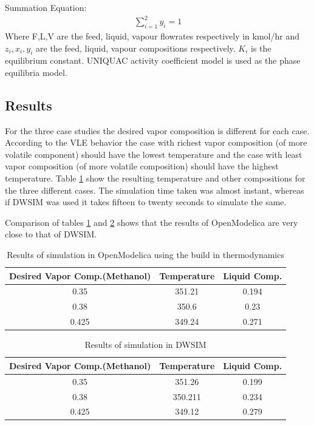 \documentclass[12pt]{report}
\begin{document}
Summation Equation: \\
\begin{gather*}
\sum_{i=1}^2y_i = 1
\end{gather*}   
Where F,L,V are the feed, liquid, vapour flowrates respectively in kmol/hr and $z_i,x_i,y_i$  are the feed, liquid, vapour compositions respectively. $K_i$ is the equilibrium constant. UNIQUAC activity coefficient model is used as the phase equilibria model. 

\subsection{Results}
For the three case studies the desired vapor composition is different for each case. According to the VLE behavior the case with richest vapor composition (of more volatile component) should have the lowest temperature and the case with least vapor composition (of more volatile composition) should have the highest temperature. Table \ref{Tab:Flash1} show the resulting temperature and other compositions for the three different cases. The simulation time taken was almost instant, whereas if DWSIM was used it takes fifteen to twenty seconds to simulate the same.

Comparison of tables \ref{Tab:Flash1} and \ref{Tab:Flash2} shows that the results of OpenModelica are very close to that of DWSIM.

\begin{table}
\centering
\caption{Results of simulation in OpenModelica using the build in thermodynamics}
\vspace{1ex}
\label{Tab:Flash1}
\begin{tabular}{|c|c|c|} \hline
Desired Vapor Comp.(Methanol) & Temperature & Liquid Comp. \\ \hline
0.35 & 351.21 & 0.194 \\
0.38 & 350.6 & 0.23 \\
0.425 & 349.24 & 0.271 \\ \hline
\end{tabular}
\end{table}

\begin{table}
\centering
\caption{Results of simulation in DWSIM}
\vspace{1ex}
\label{Tab:Flash2}
\begin{tabular}{|c|c|c|} \hline
Desired Vapor Comp.(Methanol) & Temperature & Liquid Comp. \\ \hline
0.35 & 351.26 & 0.199 \\
0.38 & 350.211 & 0.234 \\
0.425 & 349.12 & 0.279 \\ \hline
\end{tabular}
\end{table}
\end{document}
